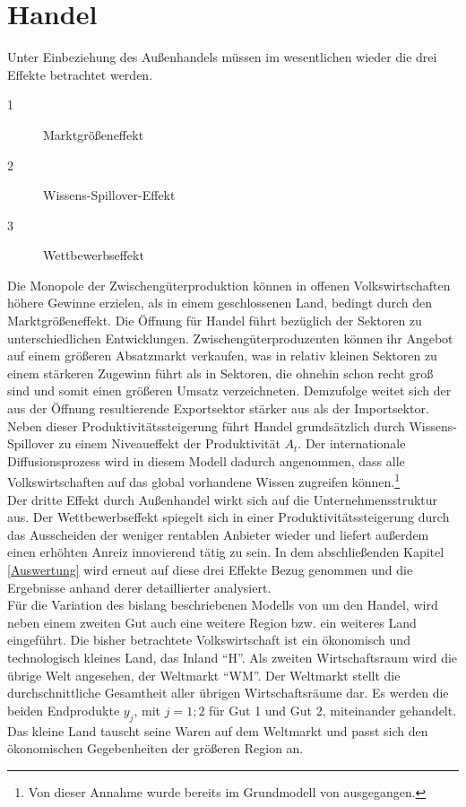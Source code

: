 \section{Handel}\label{sec:Handel}
Unter Einbeziehung des Außenhandels müssen im wesentlichen wieder die drei Effekte betrachtet werden.
%
	\begin{description}
		\item [1] Marktgrößeneffekt 
		\item [2] Wissens-Spillover-Effekt
		\item [3] Wettbewerbseffekt
	\end{description}
%		
Die Monopole der Zwischengüterproduktion können in offenen Volkswirtschaften höhere Gewinne erzielen, als in einem geschlossenen Land, bedingt durch den Marktgrößeneffekt. Die Öffnung für Handel führt bezüglich der Sektoren zu unterschiedlichen Entwicklungen. Zwischengüterproduzenten können ihr Angebot auf einem größeren Absatzmarkt verkaufen, was in relativ kleinen Sektoren zu einem stärkeren Zugewinn führt als in Sektoren, die ohnehin schon recht groß sind und somit einen größeren Umsatz verzeichneten. Demzufolge weitet sich der aus der Öffnung resultierende Exportsektor stärker aus als der Importsektor.\\
%
Neben dieser Produktivitätssteigerung führt Handel grundsätzlich durch Wissens-Spillover zu einem Niveaueffekt der Produktivität $A_t$. Der internationale Diffusionsprozess wird in diesem Modell dadurch angenommen, dass alle Volkswirtschaften auf das global vorhandene Wissen zugreifen können.\footnote{Von dieser Annahme wurde bereits im Grundmodell von \cite{Acemoglu.2006} ausgegangen.}\\
%
Der dritte Effekt durch Außenhandel wirkt sich auf die Unternehmensstruktur aus. Der Wettbewerbseffekt spiegelt sich in einer Produktivitätssteigerung durch das Ausscheiden der weniger rentablen Anbieter wieder und liefert außerdem einen erhöhten Anreiz innovierend tätig zu sein. In dem abschließenden Kapitel \ref{Auswertung} wird erneut auf diese drei Effekte Bezug genommen und die Ergebnisse anhand derer detaillierter analysiert.\\
%
Für die Variation des bislang beschriebenen Modells von \cite{Acemoglu.2006} um den Handel, wird neben einem zweiten Gut auch eine weitere Region bzw. ein weiteres Land eingeführt. Die bisher betrachtete Volkswirtschaft ist ein ökonomisch und technologisch kleines Land, das Inland "`H"'. Als zweiten Wirtschaftsraum wird die übrige Welt angesehen, der Weltmarkt "`WM"'. Der Weltmarkt stellt die durchschnittliche Gesamtheit aller übrigen Wirtschaftsräume dar. Es werden die beiden Endprodukte $y_j$, mit $j=1;2$ für Gut 1 und Gut 2, miteinander gehandelt. Das kleine Land tauscht seine Waren auf dem Weltmarkt und passt sich den ökonomischen Gegebenheiten der größeren Region an. \\
